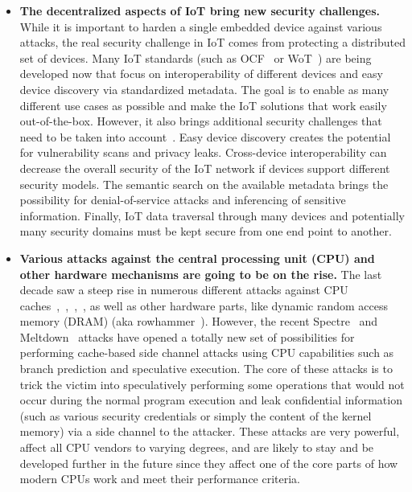 \begin{itemize}
	\item \textbf{The decentralized aspects of IoT bring new security challenges.} While it is important to harden a single embedded device against various attacks, the real security challenge in IoT comes from protecting a distributed set of devices. Many IoT standards (such as OCF~\cite{ocf} or WoT~\cite{wot}) are being developed now that focus on interoperability of different devices and easy device discovery via standardized metadata. The goal is to enable as many different use cases as possible and make the IoT solutions that work easily out-of-the-box. However, it also brings additional security challenges that need to be taken into account~\cite{McCool2018}. Easy device discovery creates the potential for vulnerability scans and privacy leaks. Cross-device interoperability can decrease the overall security of the IoT network if devices support different security models. The semantic search on the available metadata brings the possibility for denial-of-service attacks and inferencing of sensitive information. Finally, IoT data traversal through many devices and potentially many security domains must be kept secure from one end point to another.
	
	\item \textbf{Various attacks against the central processing unit (CPU) and other hardware mechanisms are going to be on the rise.} The last decade saw a steep rise in numerous different attacks against CPU caches~\cite{lipp2016armageddon},~\cite{brasser2017software},~\cite{gras2017aslr},~\cite{irazoqui2017cache}, as well as other hardware parts, like dynamic random access memory (DRAM) (aka rowhammer~\cite{seaborn2015exploiting}). However, the recent Spectre~\cite{Kocher2018spectre} and Meltdown~\cite{Lipp2018meltdown} attacks have opened a totally new set of possibilities for performing cache-based side channel attacks using CPU capabilities such as branch prediction and speculative execution. The core of these attacks is to trick the victim into speculatively performing some operations that would not occur during the normal program execution and leak confidential information (such as various security credentials or simply the content of the kernel memory) via a side channel to the attacker. These attacks are very powerful, affect all CPU vendors to varying degrees, and are likely to stay and be developed further in the future since they affect one of the core parts of how modern CPUs work and meet their performance criteria. 		
	

\end{itemize}

